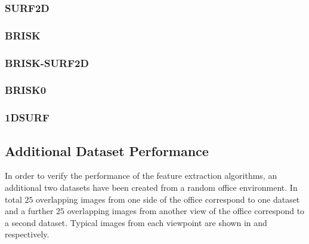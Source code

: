 \documentclass{article}
\begin{document}
\subsubsection{SURF2D}
\label{sec:2dsurfResults}


\subsubsection{BRISK}
\label{sec:briskResults}


\subsubsection{BRISK-SURF2D}
\label{sec:brisk2dsurfResults}


\subsubsection{BRISK0}
\label{sec:BRISK0Results}



\subsubsection{1DSURF}
\label{sec:1dsurfResults}





\subsection{Additional Dataset Performance}
\label{sec:additionalDataset}
In order to verify the performance of the feature extraction algorithms, an additional two datasets have been created from a random office environment. In total $25$ overlapping images from one side of the office correspond to one dataset and a further $25$ overlapping images from another view of the office correspond to a second dataset. Typical images from each viewpoint are shown in  and  respectively.\\
\end{document}
